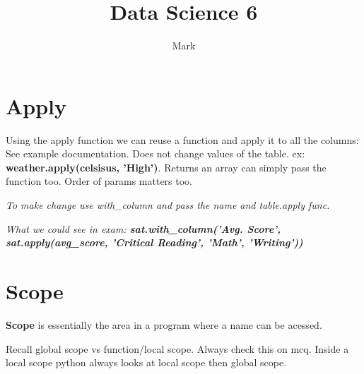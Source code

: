 \documentclass[11pt]{article}
\title{Data Science 6}
\author{Mark}
\date{}
\begin{document}
\maketitle



\section{Apply}

Using the apply function we can reuse a function and apply it to all the columns: See example documentation. Does not change values of the table. ex: \textbf{weather.apply(celsisus, 'High')}. 
Returns an array can simply pass the function too. Order of params matters too. 
\begin{note}
    \itshape To make change use with\_column and pass the name and table.apply func.
\end{note}

\begin{note}
    \itshape What we could see in exam: \textbf{sat.with\_column('Avg. Score', sat.apply(avg\_score, 'Critical Reading', 'Math', 'Writing'))}
\end{note}

\section{Scope}

\begin{definition}
    \textbf{Scope} is essentially the area in a program where a name can be acessed.
\end{definition}

Recall global scope vs function/local scope. Always check this on mcq. Inside a local scope python always looks at local scope then global scope. 
\end{document}
